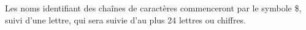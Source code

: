 Les noms identifiant des chaînes de caractères commenceront par le symbole \$, suivi d'une lettre, qui sera suivie d'au plus 24 lettres ou chiffres.